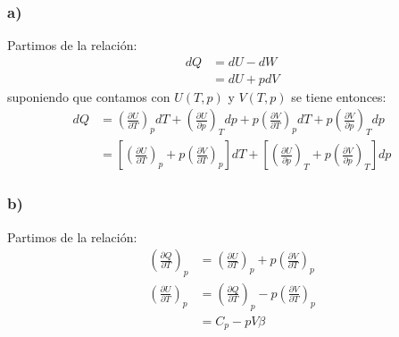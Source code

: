 \documentclass{article}
\begin{document}
\begin{tcolorbox}[breakable]
    \subsubsection*{a)}
    Partimos de la relación:
    \begin{align*}
        dQ 
        &= dU - dW \\
        &= dU + pdV
    \end{align*}
    suponiendo que contamos con $U(T,p)$ y $V(T,p)$ se tiene entonces:
    \begin{align*}
        dQ 
        &=\left(\frac{\partial U}{\partial T}\right)_p dT + \left(\frac{\partial U}{\partial p}\right)_T dp
        + p\left( \frac{\partial V}{\partial T} \right)_p dT + p\left( \frac{\partial V}{\partial p} \right)_T dp \\
        &= \left[\left(\frac{\partial U}{\partial T}\right)_p + p\left( \frac{\partial V}{\partial T} \right)_p \right] dT
        + \left[\left(\frac{\partial U}{\partial p}\right)_T + p\left( \frac{\partial V}{\partial p} \right)_T \right] dp
    \end{align*}
    \subsubsection*{b)}
    Partimos de la relación:
    \begin{align*}
        \left(\frac{\partial Q}{\partial T}\right)_p &= \left(\frac{\partial U}{\partial T}\right)_p + p\left( \frac{\partial V}{\partial T} \right)_p \\
        \left(\frac{\partial U}{\partial T}\right)_p &= \left(\frac{\partial Q}{\partial T}\right)_p  - p\left( \frac{\partial V}{\partial T} \right)_p \\
        &= C_p - pV\beta 
    \end{align*}

\end{tcolorbox}
\end{document}
